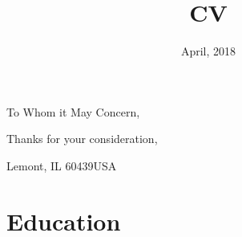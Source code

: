\documentclass[11pt,a4paper,sans]{moderncv}        %
\begin{document}
\iftrue
{}
\date{April, 2018}
\opening{To Whom it May Concern,}
\closing{Thanks for your consideration,}
\makelettertitle



\makeletterclosing

\clearpage
\fi

\title{CV}                               %
\address{9700 Cass Avenue}{Lemont, IL 60439}{USA}%
\makecvtitle

\section{Education}

\iffalse
\section{Ph.D Thesis}
\cvitem{Title}{\emph{Towards Staged Two Beam Acceleration at the Argonne Wakefield Accelerator}}
\cvitem{Advisors}{Linda Spentzouris, John Power}
\cvitem{Summary}{
	I discuss beam line design, simulation, and optimization, of a 
	beam line with the potential for dielectric two beam acceleration.
    Preliminary and prepratory experimental measurements
    are included.    }
\fi
\end{document}
